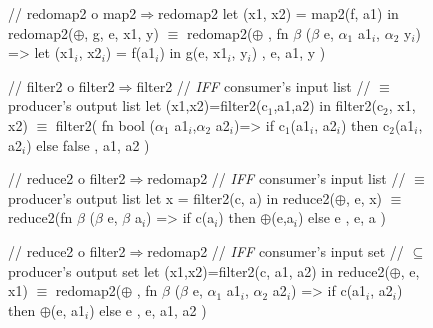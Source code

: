 \documentclass{sigplanconf}  %
\newcommand{\emp}[1]{\textcolor{DikuRed}{ #1}}
\newcommand{\emphh}[1]{\textcolor{CosGreen}{ #1}}
\newcommand{\mymath}[1]{$ #1 $}
\newcommand{\myindx}[1]{_{#1}}
\begin{document}
\begin{figure}[bt]
{\begin{minipage}{0.48\columnwidth}
\begin{colorcode}
//\emp{redomap2 o map2\mymath{\Rightarrow}redomap2}
let (x1, x2) = map2(f, a1)
in  redomap2(\mymath{\oplus}, g, e, x1, y)
    \emphh{\mymath{\equiv}}
redomap2(\mymath{\oplus}
, fn \mymath{\beta} (\mymath{\beta} e, \mymath{\alpha\myindx{1}} a1\mymath{\myindx{i}}, \mymath{\alpha\myindx{2}} y\mymath{\myindx{i}})
   => let (x1\mymath{\myindx{i}}, x2\mymath{\myindx{i}}) = f(a1\mymath{\myindx{i}})
      in  g(e, x1\mymath{\myindx{i}}, y\mymath{\myindx{i}})
, e, a1, y )
\end{colorcode}
\end{minipage}
\hfill
\begin{minipage}{0.48\columnwidth}
\begin{colorcode}
//\emp{filter2 o filter2\mymath{\Rightarrow}filter2}
//\emp{{\em{}IFF} consumer's input list}
//\emp{  \mymath{\equiv} producer's output list}
let (x1,x2)=filter2(c\mymath{\myindx{1}},a1,a2)
in  filter2(c\mymath{\myindx{2}}, x1, x2)   
    \emphh{\mymath{\equiv}}
filter2(
  fn bool (\mymath{\alpha\myindx{1}} a1\mymath{\myindx{i}},\mymath{\alpha\myindx{2}} a2\mymath{\myindx{i}})=> 
      if   c\mymath{\myindx{1}}(a1\mymath{\myindx{i}}, a2\mymath{\myindx{i}}) 
      then c\mymath{\myindx{2}}(a1\mymath{\myindx{i}}, a2\mymath{\myindx{i}}) 
      else false 
, a1, a2 )

//\emp{reduce2 o filter2\mymath{\Rightarrow}redomap2}
//\emp{{\em{}IFF} consumer's input list}
//\emp{  \mymath{\equiv} producer's output list}
let x = filter2(c, a)
in  reduce2(\mymath{\oplus}, e, x)
    \emphh{\mymath{\equiv}}
reduce2(fn \mymath{\beta} (\mymath{\beta} e, \mymath{\beta} a\mymath{\myindx{i}}) =>
  if c(a\mymath{\myindx{i}}) then \mymath{\oplus}(e,a\mymath{\myindx{i}}) else e
, e, a )

//\emp{reduce2 o filter2\mymath{\Rightarrow}redomap2}
//\emp{{\em{}IFF} consumer's input set}
//\emp{  \mymath{\subseteq} producer's output set}
let (x1,x2)=filter2(c, a1, a2)
in  reduce2(\mymath{\oplus}, e, x1)
    \emphh{\mymath{\equiv}}
redomap2(\mymath{\oplus}
, fn \mymath{\beta} (\mymath{\beta} e, \mymath{\alpha\myindx{1}} a1\mymath{\myindx{i}}, \mymath{\alpha\myindx{2}} a2\mymath{\myindx{i}})
   => if c(a1\mymath{\myindx{i}}, a2\mymath{\myindx{i}})
      then \mymath{\oplus}(e, a1\mymath{\myindx{i}}) else e
, e, a1, a2 )


\end{colorcode}
\end{minipage}}
\end{figure}
\end{document}
